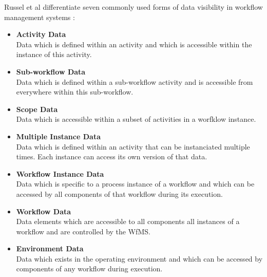     Russel et al differentiate seven commonly used forms of data visibility in workflow management systems \cite[p.~6-15]{Russell2005Workflow}:
    \begin{itemize}
      \item \textbf{Activity Data} \hfill \\
        Data which is defined within an activity and which is accessible within the instance of this activity.
      \item \textbf{Sub-workflow Data} \hfill \\
        Data which is defined within a sub-workflow activity and is accessible from everywhere within this sub-workflow.
      \item \textbf{Scope Data} \hfill \\
        Data which is accessible within a subset of activities in a worfklow instance.
      \item \textbf{Multiple Instance Data} \hfill \\
        Data which is defined within an activity that can be instanciated multiple times. Each instance can access its own version of that data.
      \item \textbf{Workflow Instance Data} \hfill \\
        Data which is specific to a process instance of a workflow and which can be accessed by all components of that workflow during its execution.
      \item \textbf{Workflow Data} \hfill \\
        Data elements which are accessible to all components all instances of a workflow and are controlled by the \ac{WfMS}.
      \item \textbf{Environment Data} \hfill \\
        Data which exists in the operating environment and which can be accessed by components of any workflow during execution.
    \end{itemize}

